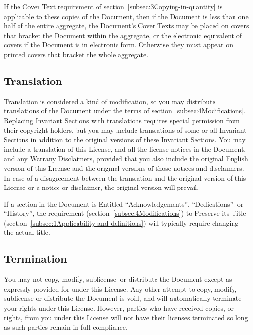 {\tiny{}If the Cover Text requirement of section~\ref{subsec:3Copying-in-quantity}
is applicable to these copies of the Document, then if the Document
is less than one half of the entire aggregate, the Document's Cover
Texts may be placed on covers that bracket the Document within the
aggregate, or the electronic equivalent of covers if the Document
is in electronic form. Otherwise they must appear on printed covers
that bracket the whole aggregate.}{\tiny\par}

\subsection*{{\tiny{}Translation}}

{\tiny{}Translation is considered a kind of modification, so you may
distribute translations of the Document under the terms of section~\ref{subsec:4Modifications}.
Replacing Invariant Sections with translations requires special permission
from their copyright holders, but you may include translations of
some or all Invariant Sections in addition to the original versions
of these Invariant Sections. You may include a translation of this
License, and all the license notices in the Document, and any Warrany
Disclaimers, provided that you also include the original English version
of this License and the original versions of those notices and disclaimers.
In case of a disagreement between the translation and the original
version of this License or a notice or disclaimer, the original version
will prevail.}{\tiny\par}

{\tiny{}If a section in the Document is Entitled \textquotedblleft Acknowledgements\textquotedblright ,
\textquotedblleft Dedications\textquotedblright , or \textquotedblleft History\textquotedblright ,
the requirement (section~\ref{subsec:4Modifications}) to Preserve
its Title (section~\ref{subsec:1Applicability-and-definitions})
will typically require changing the actual title.}{\tiny\par}

\subsection*{{\tiny{}Termination}}

{\tiny{}You may not copy, modify, sublicense, or distribute the Document
except as expressly provided for under this License. Any other attempt
to copy, modify, sublicense or distribute the Document is void, and
will automatically terminate your rights under this License. However,
parties who have received copies, or rights, from you under this License
will not have their licenses terminated so long as such parties remain
in full compliance.}{\tiny\par}

